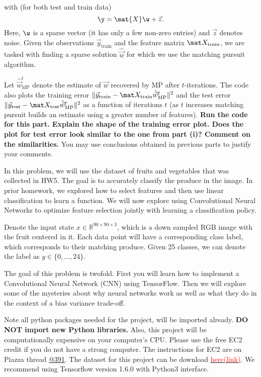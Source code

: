 \documentclass[preview]{standalone}
\begin{document}
\begin{Parts}
 with (for both test and train data) $$ \y = \mat{X}\w + \vec{z}. $$
 Here, $\w$ is a sparse vector (it has only a few non-zero entries) and $\vec z$ denotes noise. Given the observations $\vec y_{\text{train}}$ and the feature matrix $\mat X_{\text{train}}$, we are tasked with finding a sparse solution $\hat{\vec w}$ for which we use the matching pursuit algorithm. 

Let $\hat{\vec w}^t_{\text{MP}}$ denote the estimate of $\vec w$ recovered by MP after $t$-iterations.
The code also plots the training error $\Vert \vec y_{\text{train}} - \mat X_{\text{train}}  \hat{\vec w}^t_{\text{MP}}\Vert^2$ and the test error $\Vert\vec y_{\text{test}} - \mat X_{\text{test}} \hat{\vec w}^t_{\text{MP}} \Vert^2$ as a function of iterations $t$ (as $t$ increases matching pursuit builds an estimate using a greater number of features).
{\bf Run the code for this part. Explain the shape of the training error plot.  Does the plot for test error look similar to the one from part (i)? Comment on the similarities. } You may use conclusions obtained in previous parts to justify your comments.


  
\end{Parts}

In this problem, we will use the dataset of fruits and vegetables that
was collected in HW5. The goal is to accurately classify the
produce in the image. In prior homework, we explored how to select features and then use linear classification to learn a function. We will now explore using Convolutional Neural Networks to optimize feature selection jointly with learning a classification policy.

Denote the input state $x \in \mathbb{R}^{90 \times 90 \times 3}$,
which is a down sampled RGB image with the fruit
centered in it. Each data point will have a corresponding class label,
which corresponds to their matching produce. Given 25 classes, we can
denote the label as $y \in \lbrace 0,...,24 \rbrace$.

The goal of this problem is twofold. First you will learn how to implement a Convolutional Neural Network (CNN) using TensorFlow. Then we will explore some of the mysteries about why neural networks work as well as what they do in the context of a bias variance trade-off.

Note all python packages needed for the project, will be imported already. {\bf DO NOT import new Python libraries.} Also, this project will be computationally expensive on your computer's CPU. Please use the free EC2 credit if you do not have a strong computer. The instructions for EC2 are on Piazza thread \href{https://piazza.com/class/jc8np1307m34ha?cid=391}{@391}. The dataset for this project can be download \href{https://drive.google.com/file/d/1IEW0zW_37YQQ1Za5kyteu08y06EzIQgD/view}{\textcolor{red}{here(link)}}. We recommend using Tensorflow version 1.6.0 with Python3 interface.
\end{document}
